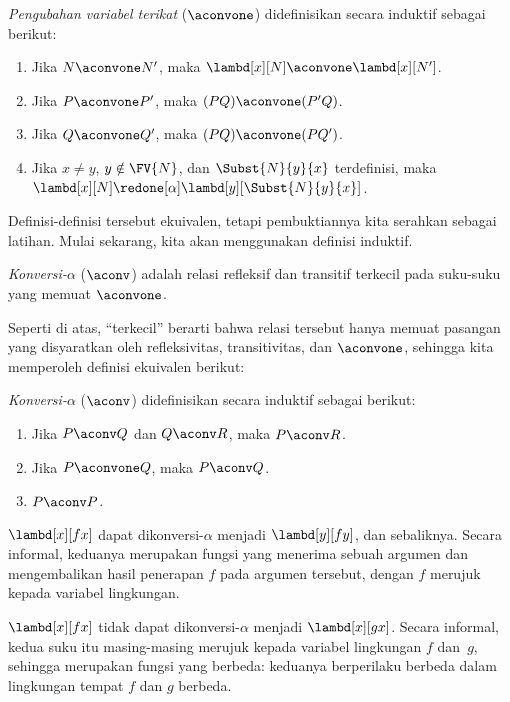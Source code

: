 \documentclass[../../../include/open-logic-section]{subfiles}
\begin{document}
\begin{defn} 
  \emph{Pengubahan variabel terikat} ($\aconvone$) didefinisikan secara
  induktif sebagai berikut:
  \begin{enumerate}
  \item Jika $N \aconvone N'$, maka $\lambd[x][N] \aconvone
    \lambd[x][N']$. 
  \item Jika $P \aconvone P'$, maka $(PQ) \aconvone (P'Q)$.
  \item Jika $Q \aconvone Q'$, maka $(PQ) \aconvone (PQ')$.
  \item Jika $x \neq y$, $y \notin \FV{N}$, dan $\Subst{N}{y}{x}$
    terdefinisi, maka
    $\lambd[x][N] \redone[\alpha] \lambd[y][\Subst{N}{y}{x}]$.
  \end{enumerate}
\end{defn}

Definisi-definisi tersebut ekuivalen, tetapi pembuktiannya kita serahkan
sebagai latihan. Mulai sekarang, kita akan menggunakan definisi induktif.

\begin{defn}
  \emph{Konversi-$\alpha$} ($\aconv$) adalah relasi refleksif dan transitif
  terkecil pada suku-suku yang memuat $\aconvone$.
\end{defn}

Seperti di atas, ``terkecil'' berarti bahwa relasi tersebut hanya memuat
pasangan yang disyaratkan oleh refleksivitas, transitivitas, dan $\aconvone$,
sehingga kita memperoleh definisi ekuivalen berikut:

\begin{defn} 
  \emph{Konversi-$\alpha$} ($\aconv$) didefinisikan secara induktif sebagai
  berikut:
  \begin{enumerate}
  \item Jika $P \aconv Q$ dan $Q \aconv R$, maka $P \aconv R$.
  \item Jika $P \aconvone Q$, maka $P \aconv Q$. 
  \item $P \aconv P$. 
  \end{enumerate}
\end{defn}

\begin{ex}
  $\lambd[x][f x]$ dapat dikonversi-$\alpha$ menjadi $\lambd[y][f y]$, dan
  sebaliknya. Secara informal, keduanya merupakan fungsi yang menerima sebuah
  argumen dan mengembalikan hasil penerapan $f$ pada argumen tersebut, dengan
  $f$ merujuk kepada variabel lingkungan.

  $\lambd[x][f x]$ tidak dapat dikonversi-$\alpha$ menjadi $\lambd[x][g x]$.
  Secara informal, kedua suku itu masing-masing merujuk kepada variabel
  lingkungan $f$ dan~$g$, sehingga merupakan fungsi yang berbeda: keduanya
  berperilaku berbeda dalam lingkungan tempat $f$ dan $g$ berbeda.
\end{ex}
\end{document}
